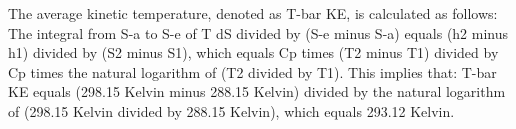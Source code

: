 The average kinetic temperature, denoted as T-bar KE, is calculated as follows:
The integral from S-a to S-e of T dS divided by (S-e minus S-a) equals (h2 minus h1) divided by (S2 minus S1), which equals Cp times (T2 minus T1) divided by Cp times the natural logarithm of (T2 divided by T1). This implies that:
T-bar KE equals (298.15 Kelvin minus 288.15 Kelvin) divided by the natural logarithm of (298.15 Kelvin divided by 288.15 Kelvin), which equals 293.12 Kelvin.